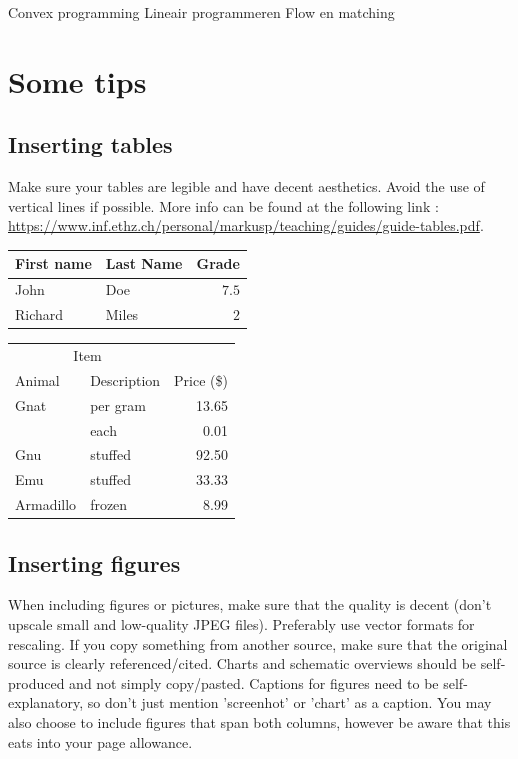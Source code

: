 \documentclass[conference]{IEEEtran}
\begin{document}
Convex programming
Lineair programmeren
Flow en matching

\section{Some tips}

\subsection{Inserting tables}

Make sure your tables are legible and have decent aesthetics. Avoid the use of vertical lines if possible. More info can be found at the following link : \url{https://www.inf.ethz.ch/personal/markusp/teaching/guides/guide-tables.pdf}.

\vspace{0.5cm}
\begin{tabular}{llr}
  \toprule
  First name & Last Name & Grade \\
  \midrule
  John & Doe & $7.5$ \\
  Richard & Miles & $2$ \\
  \bottomrule
  \end{tabular}

  \vspace{0.5cm}

  \begin{tabular}{llr}  
    \toprule
    \multicolumn{2}{c}{Item} \\
    \cmidrule(r){1-2}
    Animal    & Description & Price (\$) \\
    \midrule
    Gnat      & per gram    & 13.65      \\
          &    each     & 0.01       \\
    Gnu       & stuffed     & 92.50      \\
    Emu       & stuffed     & 33.33      \\
    Armadillo & frozen      & 8.99       \\
    \bottomrule
  \end{tabular}

  
\subsection{Inserting figures}

When including figures or pictures, make sure that the quality is decent (don't upscale small and low-quality JPEG files). Preferably use vector formats for rescaling. If you copy something from another source, make sure that the original source is clearly referenced/cited. Charts and schematic overviews should be self-produced and not simply copy/pasted. Captions for figures need to be self-explanatory, so don't just mention 'screenhot' or 'chart' as a caption. You may also choose to include figures that span both columns, however be aware that this eats into your page allowance.
\end{document}
